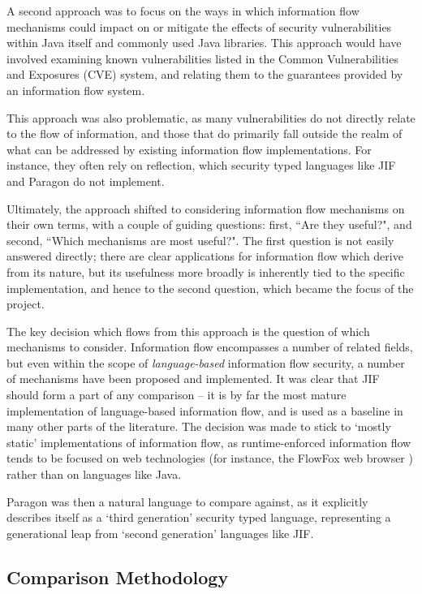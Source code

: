 A second approach was to focus on the ways in which information flow mechanisms could impact on or mitigate the effects of security vulnerabilities within Java itself and commonly used Java libraries. This approach would have involved examining known vulnerabilities listed in the Common Vulnerabilities and Exposures (CVE) system, and relating them to the guarantees provided by an information flow system.

This approach was also problematic, as many vulnerabilities do not directly relate to the flow of information, and those that do primarily fall outside the realm of what can be addressed by existing information flow implementations. For instance, they often rely on reflection, which security typed languages like JIF and Paragon do not implement.

Ultimately, the approach shifted to considering information flow mechanisms on their own terms, with a couple of guiding questions: first, ``Are they useful?", and second, ``Which mechanisms are most useful?". The first question is not easily answered directly; there are clear applications for information flow which derive from its nature, but its usefulness more broadly is inherently tied to the specific implementation, and hence to the second question, which became the focus of the project.

The key decision which flows from this approach is the question of which mechanisms to consider. Information flow encompasses a number of related fields, but even within the scope of \textit{language-based} information flow security, a number of mechanisms have been proposed and implemented. It was clear that JIF should form a part of any comparison -- it is by far the most mature implementation of language-based information flow, and is used as a baseline in many other parts of the literature. The decision was made to stick to `mostly static' implementations of information flow, as runtime-enforced information flow tends to be focused on web technologies (for instance, the FlowFox web browser \cite{degroef2012flowfox}) rather than on languages like Java.

Paragon was then a natural language to compare against, as it explicitly describes itself as a `third generation' security typed language, representing a generational leap from `second generation' languages like JIF.

\subsection{Comparison Methodology}

